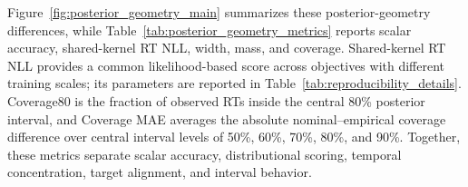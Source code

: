 \documentclass[12pt]{article}
\begin{document}
Figure~\ref{fig:posterior_geometry_main} summarizes these posterior-geometry differences, while Table~\ref{tab:posterior_geometry_metrics} reports scalar accuracy, shared-kernel RT NLL, width, mass, and coverage. Shared-kernel RT NLL provides a common likelihood-based score across objectives with different training scales; its parameters are reported in Table~\ref{tab:reproducibility_details}. Coverage80 is the fraction of observed RTs inside the central 80\% posterior interval, and Coverage MAE averages the absolute nominal--empirical coverage difference over central interval levels of 50\%, 60\%, 70\%, 80\%, and 90\%. Together, these metrics separate scalar accuracy, distributional scoring, temporal concentration, target alignment, and interval behavior.

\begin{table}[!htbp]
\centering
\caption{Holdout posterior-geometry metrics across event-time segmentation losses.}
\label{tab:posterior_geometry_metrics}
\scriptsize
\setlength{\tabcolsep}{3pt}
\renewcommand{\arraystretch}{1.12}
\end{table}
\end{document}

